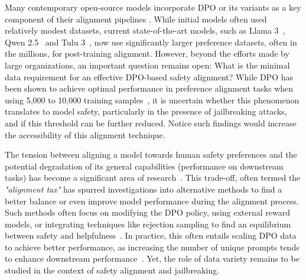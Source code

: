 Many contemporary open-source models incorporate DPO or its variants as a key component of their alignment pipelines \cite{Intel,zhu2024starlingb,tunstall2023zephyrdirectdistillationlm}. While initial models often used relatively modest datasets, current state-of-the-art models, such as Llama 3~\cite{dubey2024llama3herdmodels}, Qwen 2.5~\cite{qwen2025qwen25technicalreport} and Tulu 3~\cite{lambert2024tulu3pushingfrontiers}, now use significantly larger preference datasets, often in the millions, for post-training alignment. However, beyond the efforts made by large organizations, an important question remains open: What is the minimal data requirement for an effective DPO-based safety alignment? While DPO has been shown to achieve optimal performance in preference alignment tasks when using 5,000 to 10,000 training samples~\cite{saeidi2024insightsalignmentevaluatingdpo}, it is uncertain whether this phenomenon translates to model safety, particularly in the presence of jailbreaking attacks, and if this threshold can be further reduced. Notice such findings would increase the accessibility of this alignment technique.

The tension between aligning a model towards human safety preferences and the potential degradation of its general capabilities (\ie performance on downstream tasks) has become a significant area of research~\cite{wolf2024tradeoffsalignmenthelpfulnesslanguage}. This trade-off, often termed the \textit{"alignment tax"} has spurred investigations into alternative methods to find a better balance or even improve model performance during the alignment process. Such methods often focus on modifying the DPO policy, using external reward models, or integrating techniques like rejection sampling to find an equilibrium between safety and helpfulness~\cite{su2024missionimpossiblestatisticalperspective,anonymous2024safedpo,liu2024enhancingllmsafetyconstrained,gallego2024configurablesafetytuninglanguage, kim2024adversarialdpoharnessingharmful, khaki2024rsdpohybridrejectionsampling}. In practice, this often entails scaling DPO data to achieve better performance, as increasing the number of unique prompts tends to enhance downstream performance~\cite{lambert2024tulu3pushingfrontiers}. Yet, the role of data variety remains to be studied in the context of safety alignment and jailbreaking.

